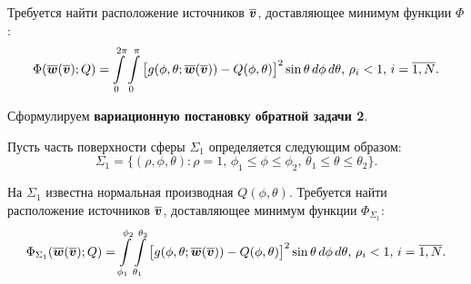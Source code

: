 Требуется найти расположение источников $\boldsymbol{\overline{v}}$, доставляющее минимум функции $\Phi$:
\begin{align}
	\Phi(\boldsymbol{\overline{w}}(\boldsymbol{\overline{v}}); Q) =
	\int\limits_{0}^{2\pi}\int\limits_{0}^{\pi}
	\big[g(\phi, \theta; \boldsymbol{\overline{w}}(\boldsymbol{\overline{v}})) - Q(\phi,\theta)\big]^2 
	\sin{\theta} \, d\phi \, d\theta \text{, }
	\rho_i < 1\text{, }
	i=\overline{1,N}
	\text{.}
\end{align}

Сформулируем \textbf{вариационную постановку обратной задачи 2}.

Пусть часть поверхности сферы $\Sigma_1$ определяется следующим образом:
\begin{equation}
	\Sigma_1 = \{(\rho,\phi,\theta): \rho=1\text{, }
	\phi_1 \le \phi \le \phi_2\text{, }
	\theta_1 \le \theta \le \theta_2 \}\text{.}
\end{equation}


На $\Sigma_1$ известна нормальная производная $Q(\phi, \theta)$. Требуется найти расположение источников $\boldsymbol{\overline{v}}$, доставляющее минимум функции $\Phi_{\Sigma_1}$:
\begin{align}
	\Phi_{\Sigma_1}(\boldsymbol{\overline{w}}(\boldsymbol{\overline{v}}); Q) =
	\int\limits_{\phi_1}^{\phi_2}
	\int\limits_{\theta_1}^{\theta_2}
	\big[g(\phi, \theta; \boldsymbol{\overline{w}}(\boldsymbol{\overline{v}})) - Q(\phi,\theta)\big]^2 
	\sin\theta \, d\phi \, d\theta \text{, }
	\rho_i < 1\text{, }
	i=\overline{1,N}
	\text{.}
\end{align}